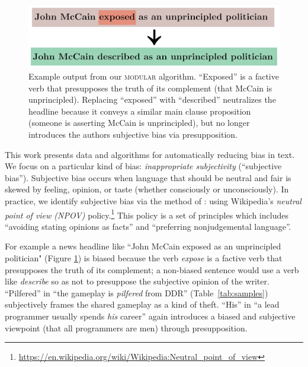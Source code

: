 \begin{figure}[]
\includegraphics[width=1\linewidth]{firstpage2.png}
\caption{Example output from our \textsc{modular} algorithm. ``Exposed'' is a factive verb that presupposes the truth of its complement  (that McCain is unprincipled). Replacing ``exposed'' with ``described'' neutralizes the headline because it conveys a similar main clause proposition (someone is asserting McCain is unprincipled), but no longer introduces the authors subjective bias via  presupposition.}%
\label{figure:cnn}
\end{figure}


This work presents data and algorithms for automatically reducing bias in text. We focus on a particular kind  of bias: \emph{inappropriate subjectivity} (``subjective bias''). Subjective bias occurs when language that should be neutral and fair is skewed by feeling, opinion, or taste (whether consciously or unconsciously). In practice, we identify subjective bias via the method of  \citet{recasens2013linguistic}: using Wikipedia's \textit{neutral point of view (NPOV)} policy.\footnote{\url{https://en.wikipedia.org/wiki/Wikipedia:Neutral_point_of_view}} This policy is a set of principles which includes ``avoiding stating opinions as facts'' and ``preferring nonjudgemental language''.

For example a news headline like ``John McCain exposed as an unprincipled politician"  (Figure \ref{figure:cnn}) is biased because the verb \textit{expose} is a factive verb that presupposes the truth of its complement; a non-biased sentence would use a verb like \textit{describe} so as not to presuppose the subjective opinion of the writer.
``Pilfered'' in ``the gameplay is \emph{pilfered} from DDR'' (Table~\ref{tab:samples}) subjectively frames the shared gameplay as a kind of theft.  ``His'' in ``a lead programmer usually spends \emph{his} career'' again introduces a biased and subjective viewpoint (that all programmers are men) through presupposition. 

